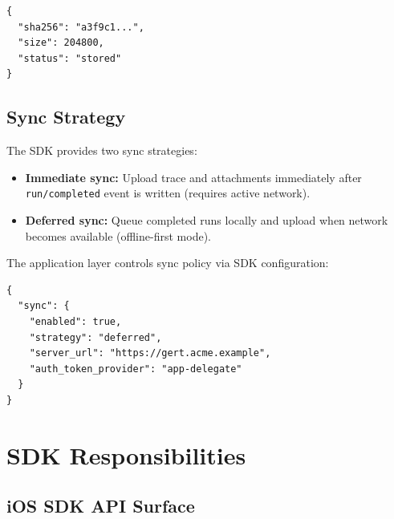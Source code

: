 \begin{verbatim}
{
  "sha256": "a3f9c1...",
  "size": 204800,
  "status": "stored"
}
\end{verbatim}

\subsection{Sync Strategy}

The SDK provides two sync strategies:

\begin{itemize}
  \item \textbf{Immediate sync:} Upload trace and attachments immediately after \texttt{run/completed} event is written (requires active network).
  \item \textbf{Deferred sync:} Queue completed runs locally and upload when network becomes available (offline-first mode).
\end{itemize}

The application layer controls sync policy via SDK configuration:

\begin{verbatim}
{
  "sync": {
    "enabled": true,
    "strategy": "deferred",
    "server_url": "https://gert.acme.example",
    "auth_token_provider": "app-delegate"
  }
}
\end{verbatim}

\section{SDK Responsibilities}

\subsection{iOS SDK API Surface}

